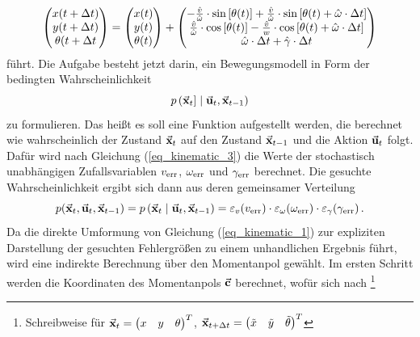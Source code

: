 \begin{equation}
\label{eq_kinematic_3}
\begin{pmatrix}
x(t+\Delta t) \\ y(t+\Delta t) \\ \theta(t+\Delta t
\end{pmatrix} 
=
\begin{pmatrix}
x(t) \\ y(t) \\ \theta(t)
\end{pmatrix} + \begin{pmatrix}
-\frac{\hat{v}}{\hat{\omega}}\cdot\text{sin}\left[ {\theta(t)} \right] + \frac{\hat{v}}{\hat{\omega}}\cdot \text{sin}\left[ {\theta(t)+\hat{\omega} \cdot \Delta t} \right] \\
\frac{\hat{v}}{\hat{\omega}}\cdot \text{cos}\left[ {\theta(t)} \right] - \frac{\hat{v}}{w}\cdot \text{cos}\left[ {\theta(t)+\hat{\omega} \cdot \Delta t} \right]\\
\hat{\omega}\cdot \Delta t + \hat{\gamma}\cdot \Delta t
\end{pmatrix}
\end{equation}
führt. Die Aufgabe besteht jetzt darin, ein Bewegungsmodell in Form der bedingten Wahrscheinlichkeit
\begin{equation}
p\left({\vec{\mathbf{x}}_t]} \hspace{1mm} \vert \hspace{1mm} {\vec{\mathbf{u}}_t, \vec{\mathbf{x}}_{t-1}}\right)
\end{equation}
zu formulieren. Das heißt es soll eine Funktion aufgestellt werden, die berechnet wie wahrscheinlich der Zustand $\vec{\mathbf{x}}_t$ auf den Zustand $\vec{\mathbf{x}}_{t-1}$ und die Aktion $\vec{\mathbf{u}}_t$ folgt. Dafür wird nach Gleichung (\ref{eq_kinematic_3}) die Werte der stochastisch unabhängigen Zufallsvariablen $v_{\text{err}}$, $\omega_{\text{err}}$ und $\gamma_{\text{err}}$ berechnet. Die gesuchte Wahrscheinlichkeit ergibt sich dann aus deren gemeinsamer Verteilung
\begin{equation}
p(\vec{\mathbf{x}}_t, \vec{\mathbf{u}}_t, \vec{\mathbf{x}}_{t-1}) = p\left({\vec{\mathbf{x}}_t} \hspace{1mm} \vert \hspace{1mm} {\vec{\mathbf{u}}_t, \vec{\mathbf{x}}_{t-1}}\right) = \varepsilon_v(v_{\text{err}})\cdot \varepsilon_\omega(\omega_{\text{err}})\cdot \varepsilon_\gamma(\gamma_{\text{err}})\,.
\end{equation}
Da die direkte Umformung von Gleichung (\ref{eq_kinematic_1}) zur expliziten Darstellung der gesuchten Fehlergrößen zu einem unhandlichen Ergebnis führt, wird eine indirekte Berechnung über den Momentanpol gewählt. Im ersten Schritt werden die Koordinaten des Momentanpols $\vec{\mathbf{c}}$ berechnet, wofür sich nach \cite[S. 130]{ProbRob} \footnote{Schreibweise für $\vec{\mathbf{x}}_t = \begin{pmatrix}
x & y &\theta
\end{pmatrix}^T$, $\vec{\mathbf{x}}_{t+\Delta t} = \begin{pmatrix}
\tilde{x} & \tilde{y} &\tilde{\theta}
\end{pmatrix}^T$}
